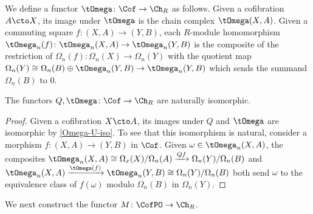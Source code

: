 \begin{defi}\label{tOmega-def}
We define a functor $\tOmega \colon \Cof \to \Ch_R$ as follows. Given a cofibration $A \cto X$, its image under $\tOmega$ is the chain complex $\tOmega(X,A)$. Given a commuting square $f \colon (X,A) \to (Y,B)$, each $R$-module homomorphism $\tOmega_n(f) \colon \tOmega_n(X,A) \to \tOmega_n(Y,B)$ is the composite of the restriction of $\Omega_n(f) \colon \Omega_n(X) \to \Omega_n(Y)$ with the quotient map $\Omega_n(Y) \cong \Omega_n(B) \oplus \tOmega_n(Y,B) \to \tOmega_n(Y,B)$ which sends the summand $\Omega_n(B)$ to $0$.
\end{defi}

\begin{proposition}\label{Omega-U}
The functors $Q, \tOmega \colon \Cof \to \Ch_R$ are naturally isomorphic.
\end{proposition}

\begin{proof}
Given a cofibration $X \cto A$, its images under $Q$ and $\tOmega$ are isomorphic by \cref{Omega-U-iso}. To see that this isomorphism is natural, consider a morphism $f \colon (X,A) \to (Y,B)$ in $\Cof$. Given $\omega \in \tOmega_n(X,A)$, the composites $\tOmega_n(X,A) \cong \Omega_x(X) / \Omega_n(A) \xrightarrow{Q f} \Omega_n(Y) / \Omega_n(B)$ and $\tOmega_n(X,A) \xrightarrow{\tOmega(f)} \tOmega_n(Y,B) \cong \Omega_n(Y) / \Omega_n(B)$ both send $\omega$ to the equivalence class of $f (\omega)$ modulo $\Omega_n(B)$ in $\Omega_n(Y)$.
\end{proof}

We next construct the functor $M \colon \CofPO \to \Ch_R$.

